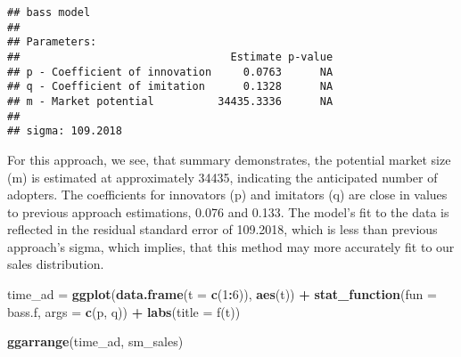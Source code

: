 \documentclass[
]{article}
\newenvironment{Shaded}{\begin{snugshade}}{\end{snugshade}}
\newcommand{\AttributeTok}[1]{\textcolor[rgb]{0.13,0.29,0.53}{#1}}
\newcommand{\DecValTok}[1]{\textcolor[rgb]{0.00,0.00,0.81}{#1}}
\newcommand{\FunctionTok}[1]{\textcolor[rgb]{0.13,0.29,0.53}{\textbf{#1}}}
\newcommand{\NormalTok}[1]{#1}
\newcommand{\OtherTok}[1]{\textcolor[rgb]{0.56,0.35,0.01}{#1}}
\newcommand{\SpecialCharTok}[1]{\textcolor[rgb]{0.81,0.36,0.00}{\textbf{#1}}}
\newcommand{\StringTok}[1]{\textcolor[rgb]{0.31,0.60,0.02}{#1}}
\begin{document}
\begin{Shaded}
\end{Shaded}

\begin{verbatim}
## bass model
## 
## Parameters:
##                                 Estimate p-value
## p - Coefficient of innovation     0.0763      NA
## q - Coefficient of imitation      0.1328      NA
## m - Market potential          34435.3336      NA
## 
## sigma: 109.2018
\end{verbatim}

For this approach, we see, that summary demonstrates, the potential
market size (m) is estimated at approximately 34435, indicating the
anticipated number of adopters. The coefficients for innovators (p) and
imitators (q) are close in values to previous approach estimations,
0.076 and 0.133. The model's fit to the data is reflected in the
residual standard error of 109.2018, which is less than previous
approach's sigma, which implies, that this method may more accurately
fit to our sales distribution.

\begin{Shaded}
\begin{Highlighting}[]
\NormalTok{time\_ad }\OtherTok{=} \FunctionTok{ggplot}\NormalTok{(}\FunctionTok{data.frame}\NormalTok{(}\AttributeTok{t =} \FunctionTok{c}\NormalTok{(}\DecValTok{1}\SpecialCharTok{:}\DecValTok{6}\NormalTok{)), }\FunctionTok{aes}\NormalTok{(t)) }\SpecialCharTok{+}
\FunctionTok{stat\_function}\NormalTok{(}\AttributeTok{fun =}\NormalTok{ bass.f, }\AttributeTok{args =} \FunctionTok{c}\NormalTok{(p, q)) }\SpecialCharTok{+}
\FunctionTok{labs}\NormalTok{(}\AttributeTok{title =} \StringTok{\textquotesingle{}f(t)\textquotesingle{}}\NormalTok{)}

\FunctionTok{ggarrange}\NormalTok{(time\_ad, sm\_sales)}
\end{Highlighting}
\end{Shaded}
\end{document}
